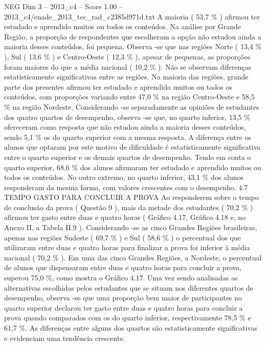 \begin{textsample}{NEG Dim 3 – 2013\_c4 – Score 1.00 – 2013\_c4/enade\_2013\_tec\_rad\_c2385d971d.txt}
A maioria ( 53,7 \% ) afirmou ter estudado e aprendido muitos ou todos os conteúdos.
Na análise por Grande Região, a proporção de respondentes que escolheram a opção não estudou ainda a maioria desses conteúdos, foi pequena.
Observa -se que nas regiões Norte ( 13,4 \% ), Sul ( 13,6 \% ) e Centro-Oeste ( 12,3 \% ), apesar de pequenas, as proporções foram maiores do que a média nacional ( 10,2 \% ).
Não se observam diferenças estatisticamente significativas entre as regiões.
Na maioria das regiões, grande parte dos presentes afirmou ter estudado e aprendido muitos ou todos os conteúdos, com proporções variando entre 47,0 \% na região Centro-Oeste e 58,5 \% na região Nordeste.
Considerando -se separadamente as opiniões de estudantes dos quatro quartos de desempenho, observa -se que, no quarto inferior, 13,5 \% ofereceram como resposta que não estudou ainda a maioria desses conteúdos, sendo 5,1 \% os do quarto superior com a mesma resposta.
A diferença entre os alunos que optaram por este motivo de dificuldade é estatisticamente significativa entre o quarto superior e os demais quartos de desempenho.
Tendo em conta o quarto superior, 68,6 \% dos alunos afirmaram ter estudado e aprendido muitos ou todos os conteúdos.
No outro extremo, no quarto inferior, 43,1 \% dos alunos responderam da mesma forma, com valores crescentes com o desempenho. 4.7 TEMPO GASTO PARA CONCLUIR A PROVA Ao responderem sobre o tempo de conclusão da prova ( Questão 9 ), mais da metade dos estudantes ( 70,2 \% ) afirmou ter gasto entre duas e quatro horas ( Gráfico 4.17, Gráfico 4.18 e, no Anexo II, a Tabela II.9 ).
Considerando -se as cinco Grandes Regiões brasileiras, apenas nas regiões Sudeste ( 69,7 \% ) e Sul ( 58,6 \% ) o percentual dos que utilizaram entre duas e quatro horas para finalizar a prova foi inferior à média nacional ( 70,2 \% ).
Em uma das cinco Grandes Regiões, a Nordeste, o percentual de alunos que dispensaram entre duas e quatro horas para concluir a prova, superou 75,0 \%, como mostra o Gráfico 4.17.
Uma vez sendo analisadas as alternativas escolhidas pelos estudantes que se situam nos diferentes quartos de desempenho, observa -se que uma proporção bem maior de participantes no quarto superior declarou ter gasto entre duas e quatro horas para concluir a prova quando comparados com os do quarto inferior, respectivamente 78,5 \% e 61,7 \%.
As diferenças entre alguns dos quartos são estatisticamente significativas e evidenciam uma tendência crescente.

\end{textsample}
